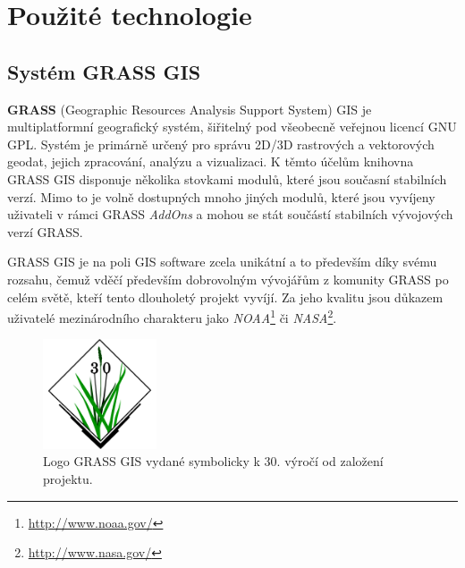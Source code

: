 \documentclass[a4paper,12pt,oneside]{report}
\begin{document}
\setcounter{footnote}{1}




\section{Použité technologie}

\subsection{Systém GRASS GIS}
\textbf{GRASS} (Geographic Resources Analysis Support System) GIS  je multiplatformní geografický systém, šiřitelný pod všeobecně veřejnou licencí \acs{GNU GPL}. Systém je primárně určený pro správu 2D/3D rastrových a vektorových geodat, jejich zpracování, analýzu a vizualizaci. K těmto účelům knihovna GRASS GIS disponuje několika stovkami modulů, které jsou současní stabilních verzí. Mimo to je volně dostupných mnoho jiných modulů, které jsou vyvíjeny uživateli v rámci GRASS \textit{AddOns} a mohou se stát součástí stabilních vývojových verzí GRASS. 

GRASS GIS je na poli GIS software zcela unikátní a to především díky svému rozsahu, čemuž vděčí především dobrovolným vývojářům z komunity GRASS po celém světě, kteří tento dlouholetý projekt vyvíjí. Za jeho kvalitu jsou důkazem uživatelé mezinárodního charakteru jako \textit{NOAA}\footnote{\url{http://www.noaa.gov/}} či \textit{NASA}\footnote{\url{http://www.nasa.gov/}}. 

\begin{figure}[h!]
    \centering
    \includegraphics[width=0.3\textwidth]{./img/grass/grasslogo.png}
    \caption[Logo GRASS]{\centering Logo GRASS GIS vydané symbolicky k 30. výročí od založení projektu. \footnotemark }
 \end{figure}   
\end{document}
